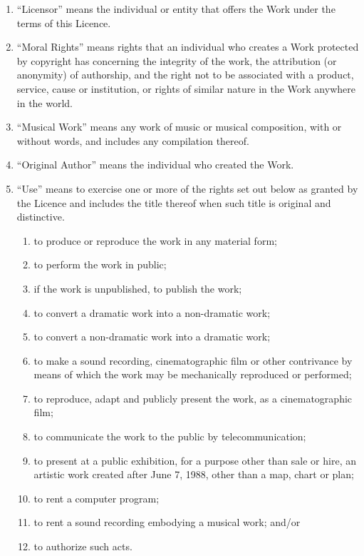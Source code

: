 \begin{enumerate}
\begin{enumerate}
         \item ``Licensor'' means the individual or entity that offers the Work under the terms of this Licence.
         \item ``Moral Rights'' means rights that an individual who creates a Work protected by copyright has concerning the integrity of the work, the attribution (or anonymity) of authorship, and the right not to be associated with a product, service, cause or institution, or rights of similar nature in the Work anywhere in the world.
         \item ``Musical Work'' means any work of music or musical composition, with or without words, and includes any compilation thereof.
         \item ``Original Author'' means the individual who created the Work.
         \item ``Use'' means to exercise one or more of the rights set out below as granted by the Licence and includes the title thereof when such title is original and distinctive.
		\begin{enumerate}
               \item to produce or reproduce the work in any material form;
               \item to perform the work in public;
               \item if the work is unpublished, to publish the work;
               \item to convert a dramatic work into a non-dramatic work;
               \item to convert a non-dramatic work into a dramatic work;
               \item to make a sound recording, cinematographic film or other contrivance by means of which the work may be mechanically reproduced or performed;
               \item to reproduce, adapt and publicly present the work, as a cinematographic film;
               \item to communicate the work to the public by telecommunication;
               \item to present at a public exhibition, for a purpose other than sale or hire, an artistic work created after June 7, 1988, other than a map, chart or plan;
               \item to rent a computer program;
              \item to rent a sound recording embodying a musical work; and/or
              \item to authorize such acts.

\end{enumerate}
\end{enumerate}
\end{enumerate}
